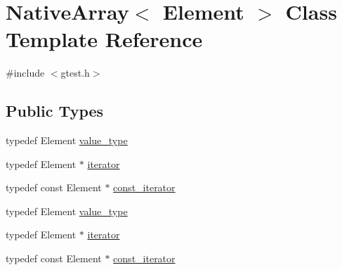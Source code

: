\hypertarget{classtesting_1_1internal_1_1NativeArray}{\section{\-Native\-Array$<$ \-Element $>$ \-Class \-Template \-Reference}
\label{d6/de6/classtesting_1_1internal_1_1NativeArray}
}


{\ttfamily \#include $<$gtest.\-h$>$}

\subsection*{\-Public \-Types}
\begin{DoxyCompactItemize}
\item 
typedef \-Element \hyperlink{classtesting_1_1internal_1_1NativeArray_a02bfdb9fd305b46f492e4d7d2ef4e0b0}{value\-\_\-type}
\item 
typedef \-Element $\ast$ \hyperlink{classtesting_1_1internal_1_1NativeArray_a2869d20ba91b6a6578464123e825fc9f}{iterator}
\item 
typedef const \-Element $\ast$ \hyperlink{classtesting_1_1internal_1_1NativeArray_a673a2c2010a7e9bdcc7b6b75d54121f5}{const\-\_\-iterator}
\item 
typedef \-Element \hyperlink{classtesting_1_1internal_1_1NativeArray_a02bfdb9fd305b46f492e4d7d2ef4e0b0}{value\-\_\-type}
\item 
typedef \-Element $\ast$ \hyperlink{classtesting_1_1internal_1_1NativeArray_a2869d20ba91b6a6578464123e825fc9f}{iterator}
\item 
typedef const \-Element $\ast$ \hyperlink{classtesting_1_1internal_1_1NativeArray_a673a2c2010a7e9bdcc7b6b75d54121f5}{const\-\_\-iterator}
\end{DoxyCompactItemize}
